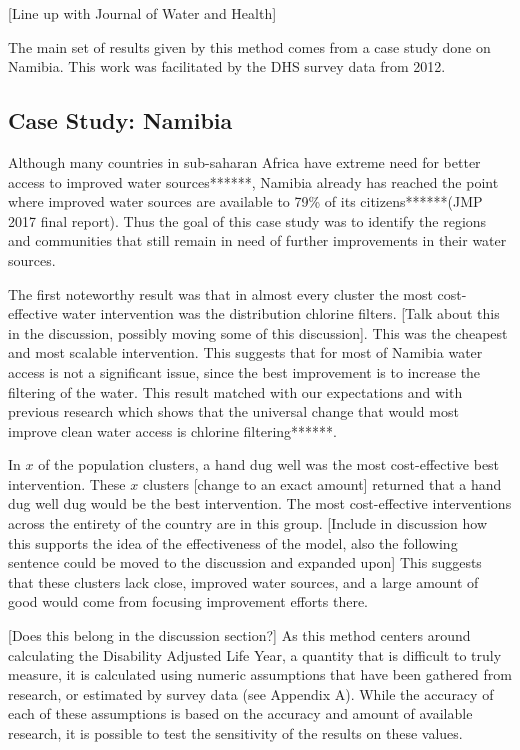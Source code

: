 [Line up with Journal of Water and Health]

The main set of results given by this method comes from a case study done on Namibia. This work was facilitated by the DHS survey data from 2012.

\subsection{Case Study: Namibia}

Although many countries in sub-saharan Africa have extreme need for better access to improved water sources******,  Namibia already has reached the point where improved water sources are available to 79\% of its citizens******(JMP 2017 final report).
Thus the goal of this case study was to identify the regions and communities that still remain in need of further improvements in their water sources.  

The first noteworthy result was that in almost every cluster the most cost-effective water intervention was the distribution chlorine filters. [Talk about this in the discussion, possibly moving some of this discussion].
This was the cheapest and most scalable intervention.
This suggests that for most of Namibia water access is not a significant issue, since the best improvement is to increase the filtering of the water.
This result matched with our expectations and with previous research which shows that the universal change that would most improve clean water access is chlorine filtering******.

In $x$ of the population clusters, a hand dug well was the most cost-effective best intervention.
These $x$ clusters [change to an exact amount] returned that a hand dug well dug would be the best intervention.
The most cost-effective interventions across the entirety of the country are in this group. 
[Include in discussion how this supports the idea of the effectiveness of the model, also the following sentence could be moved to the discussion and expanded upon]
This suggests that these clusters lack close, improved water sources, and a large amount of good would come from focusing improvement efforts there.

[Does this belong in the discussion section?]
As this method centers around calculating the Disability Adjusted Life Year, a quantity that is difficult to truly measure, it is calculated using numeric assumptions that have been gathered from research, or estimated by survey data (see Appendix A).
While the accuracy of each of these assumptions is based on the accuracy and amount of available research, it is possible to test the sensitivity of the results on these values.

